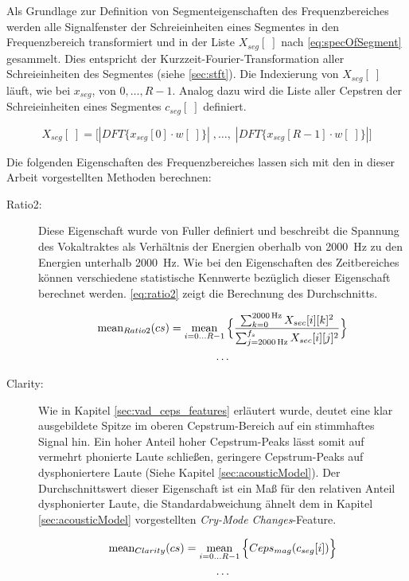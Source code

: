 Als Grundlage zur Definition von Segmenteigenschaften des Frequenzbereiches werden alle Signalfenster der Schreieinheiten eines Segmentes in den Frequenzbereich transformiert und in der Liste $X_{seg}[\;]$ nach \ref{eq:specOfSegment} gesammelt. Dies entspricht der Kurzzeit-Fourier-Transformation aller Schreieinheiten des Segmentes (siehe \autoref{sec:stft}). Die Indexierung von $X_{seg}[\;]$ läuft, wie bei $x_{seg}$, von $0 , \ldots , R-1$. Analog dazu wird die Liste aller Cepstren der Schreieinheiten eines Segmentes $c_{seg}[\;]$ definiert. 

\begin{equation}
X_{seg}[\; ] = \Big[ |DFT\{x_{seg}[0] \cdot w[\;]\}| \; , \ldots , \; |DFT\{x_{seg}[R-1] \cdot w[\;]\}| \Big]
\label{eq:specOfSegment}
\end{equation}


Die folgenden Eigenschaften des Frequenzbereiches lassen sich mit den in dieser Arbeit vorgestellten Methoden berechnen:

\begin{description}
\item[Ratio2:] Diese Eigenschaft wurde von Fuller \cite{threeCryTypes} definiert und beschreibt die Spannung des Vokaltraktes als Verhältnis der Energien oberhalb von \SI{2000}{\hertz} zu den Energien unterhalb \SI{2000}{\hertz}. Wie bei den Eigenschaften des Zeitbereiches können verschiedene statistische Kennwerte bezüglich dieser Eigenschaft berechnet werden. \autoref{eq:ratio2} zeigt die Berechnung des Durchschnitts.

\begin{equation}
\begin{gathered}
\text{mean}_{Ratio2}(cs) = \operatorname*{mean}_{i=0\ldots R-1} \Big\{ \frac{\sum_{k=0}^{\SI{2000}{\hertz}} X_{sec}[i][k]^2}{\sum_{j=\SI{2000}{\hertz}}^{f_{s}} X_{sec}[i][j]^2} \Big\} \\
\ldots
\end{gathered}
\label{eq:ratio2}
\end{equation}


\item[Clarity: ] Wie in Kapitel \ref{sec:vad_ceps_features} erläutert wurde, deutet eine klar ausgebildete Spitze im oberen Cepstrum-Bereich auf ein stimmhaftes Signal hin. Ein hoher Anteil hoher Cepstrum-Peaks lässt somit auf vermehrt phonierte Laute schließen, geringere Cepstrum-Peaks auf dysphoniertere Laute (Siehe Kapitel \ref{sec:acousticModel}). Der Durchschnittswert dieser Eigenschaft ist ein Maß für den relativen Anteil dysphonierter Laute, die Standardabweichung ähnelt dem in Kapitel \ref{sec:acousticModel} vorgestellten \emph{Cry-Mode Changes}-Feature.

\begin{equation}
\begin{gathered}
\text{mean}_{Clarity}(cs) = \operatorname*{mean}_{i=0\ldots R-1} \Big\{ Ceps_{mag}(c_{seg}[i])  \Big\} \\
\ldots
\end{gathered}
\end{equation}
	
	
\end{description}

